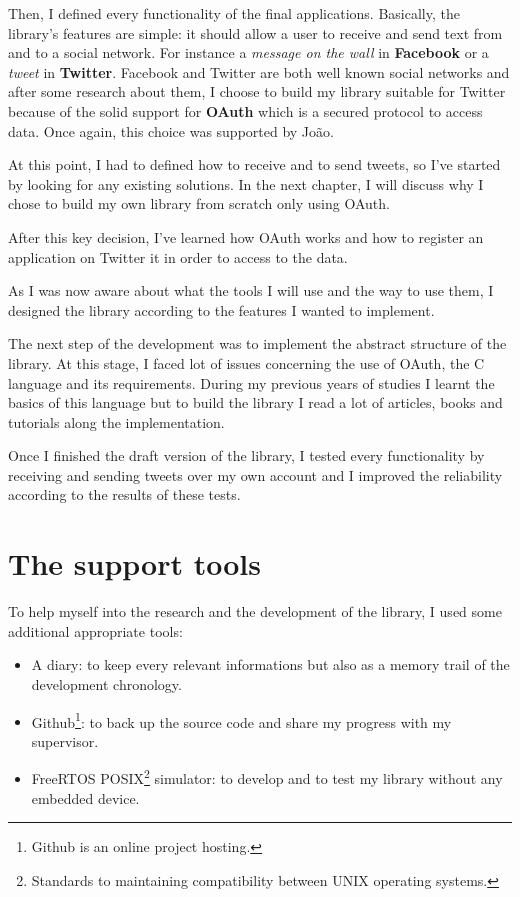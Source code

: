 Then, I defined every functionality of the final applications. Basically, the library's features are simple: it should allow a user to receive and send text from and to a social network. For instance a \textit{message on the wall} in \textbf{Facebook} or a \textit{tweet} in \textbf{Twitter}. Facebook and Twitter are both well known social networks and after some research about them, I choose to build my library suitable for Twitter because of the solid support for \textbf{OAuth} which is a secured protocol to access data. Once again, this choice was supported by Jo\~{a}o.

At this point, I had to defined how to receive and to send tweets, so I've started by looking for any existing solutions. In the next chapter, I will discuss why I chose to build my own library from scratch only using OAuth.

After this key decision, I've learned how OAuth works and how to register an application on Twitter it in order to access to the data.

As I was now aware about what the tools I will use and the way to use them, I designed the library according to the features I wanted to implement.

The next step of the development was to implement the abstract structure of the library. At this stage, I faced lot of issues concerning the use of OAuth, the C language and its requirements. During my previous years of studies I learnt the basics of this language but to build the library I read a lot of articles, books and tutorials along the implementation.

Once I finished the draft version of the library, I tested every functionality by receiving and sending tweets over my own account and I improved the reliability according to the results of these tests.



\section{The support tools}

\hspace{15mm}To help myself into the research and the development of the library, I used some additional appropriate tools:
\begin{itemize}
\item A diary: to keep every relevant informations but also as a memory trail of the development chronology.
\item Github\footnote{Github is an online project hosting.}: to back up the source code and share my progress with my supervisor.
\item FreeRTOS POSIX\footnote{Standards to maintaining compatibility between UNIX operating systems.} simulator: to develop and to test my library without any embedded device.
\end{itemize}

\clearpage
